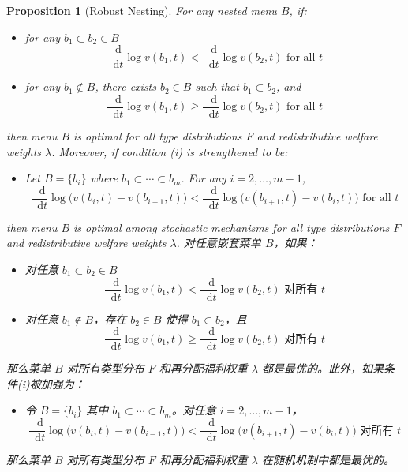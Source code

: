 \documentclass[12pt,letterpaper]{article}
\newenvironment{original}{\color{black}\noindent}{}
\newenvironment{translation}{\color{blue}\noindent}{}
\theoremstyle{plain}
\newtheorem{prop}{Proposition}
\theoremstyle{definition}
\theoremstyle{remark}
\renewcommand{\1}{\mathds{1}}
\renewcommand*\d{\mathop{}\!\mathrm{d}}
\theoremstyle{definition}
\begin{document}
\begin{prop}[Robust Nesting]\label{prop:nesting}
\begin{original}
For any nested menu $B$, if:
\begin{itemize}
    \item[(i)] for any $b_1 \subset b_2 \in B$
    \[\frac{\d}{\d t} \log v(b_1, t) < \frac{\d}{\d t} \log v(b_2, t) \text{ for all $t$} \tag{1}\]
    \item[(ii)] for any $b_1 \notin B$, there exists $b_2 \in B$ such that $b_1 \subset b_2$, and
    \[\frac{\d}{\d t} \log v(b_1, t) \geq \frac{\d}{\d t} \log v(b_2, t) \text{ for all $t$} \tag{2}\]
\end{itemize}
then menu $B$ is optimal for all type distributions $F$ and redistributive welfare weights $\lambda$. Moreover, if condition \textit{(i)} is strengthened to be:
\begin{itemize}
    \item[(i')] Let $B = \{b_i\}$ where $b_1\subset \cdots \subset b_m$. For any $i = 2, \dots, m-1$,
    \[\frac{\d}{\d t} \log \Big(v(b_{i}, t) - v(b_{i-1}, t)\Big) < \frac{\d}{\d t} \log\Big(v(b_{i+1}, t) - v(b_{i}, t)\Big)  \text{ for all $t$} \tag{1'}\]
\end{itemize}
then menu $B$ is optimal among stochastic mechanisms for all type distributions $F$ and redistributive welfare weights $\lambda$.
\end{original}
\begin{translation}
对任意嵌套菜单 $B$，如果：
\begin{itemize}
    \item[(i)] 对任意 $b_1 \subset b_2 \in B$
    \[\frac{\d}{\d t} \log v(b_1, t) < \frac{\d}{\d t} \log v(b_2, t) \text{ 对所有 $t$} \tag{1}\]
    \item[(ii)] 对任意 $b_1 \notin B$，存在 $b_2 \in B$ 使得 $b_1 \subset b_2$，且
    \[\frac{\d}{\d t} \log v(b_1, t) \geq \frac{\d}{\d t} \log v(b_2, t) \text{ 对所有 $t$} \tag{2}\]
\end{itemize}
那么菜单 $B$ 对所有类型分布 $F$ 和再分配福利权重 $\lambda$ 都是最优的。此外，如果条件\textit{(i)}被加强为：
\begin{itemize}
    \item[(i')] 令 $B = \{b_i\}$ 其中 $b_1\subset \cdots \subset b_m$。对任意 $i = 2, \dots, m-1$，
    \[\frac{\d}{\d t} \log \Big(v(b_{i}, t) - v(b_{i-1}, t)\Big) < \frac{\d}{\d t} \log\Big(v(b_{i+1}, t) - v(b_{i}, t)\Big)  \text{ 对所有 $t$} \tag{1'}\]
\end{itemize}
那么菜单 $B$ 对所有类型分布 $F$ 和再分配福利权重 $\lambda$ 在随机机制中都是最优的。
\end{translation}
\end{prop}
\end{document}

